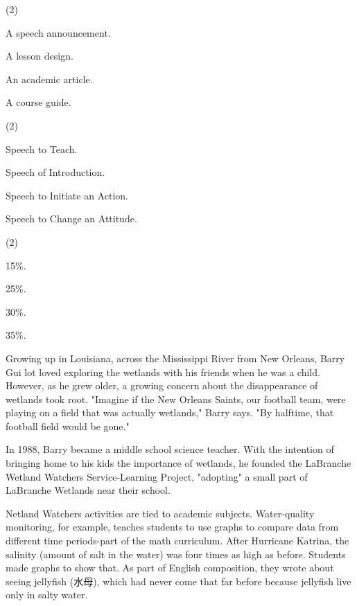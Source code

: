 \documentclass{英语试卷}
\begin{document}
\begin{choices}(2)
  \item A speech announcement.
  \item A lesson design.
  \item An academic article.
  \item A course guide.
\end{choices}
\begin{choices}(2)
  \item Speech to Teach.
  \item Speech of Introduction.
  \item Speech to Initiate an Action.
  \item Speech to Change an Attitude.
\end{choices}
\begin{choices}(2)
  \item 15\%.
  \item 25\%.
  \item 30\%.
  \item 35\%.
\end{choices}
\par Growing up in Louisiana, across the Mississippi River from New Orleans, Barry Gui lot loved exploring the wetlands with his friends when he was a child. However, as he grew older, a growing concern about the disappearance of wetlands took root. "Imagine if the New Orleans Saints, our football team, were playing on a field that was actually wetlands," Barry says. "By halftime, that football field would be gone."\par
\par In 1988, Barry became a middle school science teacher. With the intention of bringing home to his kids the importance of wetlands, he founded the LaBranche Wetland Watchers Service-Learning Project, "adopting" a small part of LaBranche Wetlands near their school.\par
\par Netland Watchers activities are tied to academic subjects. Water-quality monitoring, for example, teaches students to use graphs to compare data from different time periods-part of the math curriculum. After Hurricane Katrina, the salinity (amount of salt in the water) was four times as high as before. Students made graphs to show that. As part of English composition, they wrote about seeing jellyfish (水母), which had never come that far before because jellyfish live only in salty water.\par
\end{document}
